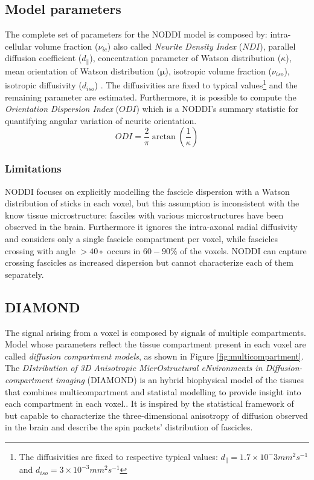   \subsection*{Model parameters}
  The complete set of parameters for the NODDI model is composed by: intra-cellular volume fraction ($\nu_{ic}$) also called \emph{Neurite Density Index} ($NDI$), parallel diffusion coefficient ($d_{\parallel}$), concentration parameter of Watson distribution ($\kappa$), mean orientation of Watson distribution ($\mathbf{\mu}$), isotropic volume fraction ($\nu_{iso}$), isotropic diffusivity ($d_{iso}$) \cite{zhang2012noddi}.
  The diffusivities are fixed to typical values\footnote{The diffusivities are fixed to respective typical values: $d_{\parallel}=1.7\times10^-3 mm^2s^{-1}$ and $d_{iso}=3\times10^{-3}mm^2s^{-1}$} and the remaining parameter are estimated. Furthermore, it is possible to compute the \emph{Orientation Dispersion Index} ($ODI$) \cite{zhang2011axon} which is a NODDI's summary statistic for quantifying angular variation of neurite orientation.
  \begin{equation}
   ODI = \frac{2}{\pi}\arctan(\frac{1}{\kappa})
  \end{equation}

  \subsubsection*{Limitations}
  NODDI focuses on explicitly modelling the fascicle dispersion with a Watson distribution of sticks in each voxel, but this assumption is inconsistent with the know tissue microstructure: fasciles with various microstructures have been observed in the brain. Furthermore it ignores the intra-axonal radial diffusivity and considers only a single fascicle compartment per voxel, while fascicles crossing with angle $>40\circ$ occurs in $60-90\%$ of the voxels. NODDI can capture crossing fascicles as increased dispersion but cannot characterize each of them separately. \cite{scherrer2016diamond}
 \subsection{DIAMOND}
 The signal arising from a voxel is composed by signals of multiple compartments. Model whose parameters reflect the tissue compartment present in each voxel are called \emph{diffusion compartment models}, as shown in Figure \ref{fig:multicompartment}. The \emph{DIstribution of 3D Anisotropic MicrOstructural eNvironments in Diffusion-compartment imaging} (DIAMOND) is an hybrid biophysical model of the tissues that combines multicompartment and statistal modelling to provide insight into each compartment in each voxel.\cite{scherrer2016diamond}. It is inspired by the statistical framework of \cite{yablonskiy2003} but capable to characterize the three-dimensional anisotropy of diffusion observed in the brain and describe the spin packets' distribution of fascicles. 

